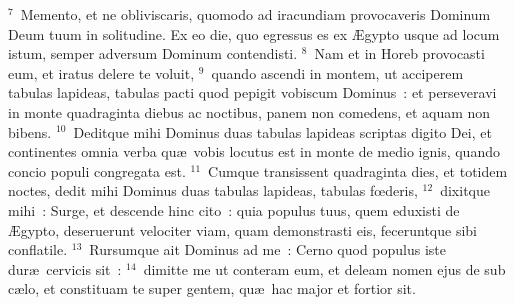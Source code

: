 ${}^{7}$~Memento, et ne obliviscaris, quomodo ad iracundiam provocaveris Dominum Deum tuum in solitudine. Ex eo die, quo egressus es ex \AE gypto usque ad locum istum, semper adversum Dominum contendisti.
${}^{8}$~Nam et in Horeb provocasti eum, et iratus delere te voluit,
${}^{9}$~quando ascendi in montem, ut acciperem tabulas lapideas, tabulas pacti quod pepigit vobiscum Dominus~: et perseveravi in monte quadraginta diebus ac noctibus, panem non comedens, et aquam non bibens.
${}^{10}$~Deditque mihi Dominus duas tabulas lapideas scriptas digito Dei, et continentes omnia verba qu\ae\ vobis locutus est in monte de medio ignis, quando concio populi congregata est.
${}^{11}$~Cumque transissent quadraginta dies, et totidem noctes, dedit mihi Dominus duas tabulas lapideas, tabulas fœderis,
${}^{12}$~dixitque mihi~: Surge, et descende hinc cito~: quia populus tuus, quem eduxisti de \AE gypto, deseruerunt velociter viam, quam demonstrasti eis, feceruntque sibi conflatile.
${}^{13}$~Rursumque ait Dominus ad me~: Cerno quod populus iste dur\ae\ cervicis sit~:
${}^{14}$~dimitte me ut conteram eum, et deleam nomen ejus de sub c\ae lo, et constituam te super gentem, qu\ae\ hac major et fortior sit.


